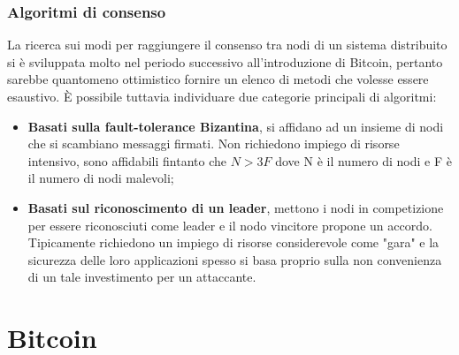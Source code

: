 		\subsubsection{Algoritmi di consenso}
			La ricerca sui modi per raggiungere il consenso tra nodi di un sistema distribuito si è sviluppata molto nel periodo successivo all'introduzione di Bitcoin, pertanto sarebbe quantomeno ottimistico fornire un elenco di metodi che volesse essere esaustivo. È possibile tuttavia individuare due categorie principali di algoritmi:
			\begin{itemize}
				\item \textbf{Basati sulla fault-tolerance Bizantina}, si affidano ad un insieme di nodi che si scambiano messaggi firmati. Non richiedono impiego di risorse intensivo, sono affidabili fintanto che $N > 3F$ dove N è il numero di nodi e F è il numero di nodi malevoli;
				\item \textbf{Basati sul riconoscimento di un leader}, mettono i nodi in competizione per essere riconosciuti come leader e il nodo vincitore propone un accordo. Tipicamente richiedono un impiego di risorse considerevole come "gara" e la sicurezza delle loro applicazioni spesso si basa proprio sulla non convenienza di un tale investimento per un attaccante.
			\end{itemize}
\section{Bitcoin}
